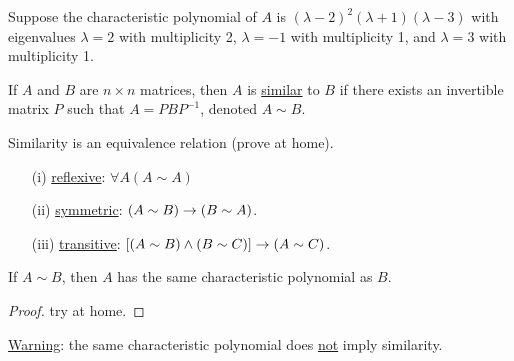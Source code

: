 \documentclass[10pt,a4paper]{article}
\begin{document}
\begin{example}
	Suppose the characteristic polynomial of $A$ is $(\lambda-2)^2(\lambda+1)(\lambda-3)$ with eigenvalues $\lambda=2$ with multiplicity 2, $\lambda=-1$ with multiplicity 1, and $\lambda=3$ with multiplicity 1.
\end{example}
\begin{definition}
	If $A$ and $B$ are $n\times n$ matrices, then $A$ is \underline{similar} to $B$ if there exists an invertible matrix $P$ such that $A = PBP^{-1}$, denoted $A\sim B$.
\end{definition}
\begin{note}
	Similarity is an equivalence relation (prove at home).
	\begin{enumerate}
		\item[(i)] \underline{reflexive}: $\forall A(A\sim A)$
		\item[(ii)] \underline{symmetric}: $(A\sim B)\rightarrow(B\sim A)$.
		\item[(iii)] \underline{transitive}: $[(A\sim B)\land(B\sim C)]\rightarrow(A\sim C)$.
	\end{enumerate}
\end{note}
\begin{theorem}
	If $A\sim B$, then $A$ has the same characteristic polynomial as $B$.
\end{theorem}
\begin{proof}
	try at home.
\end{proof}
\underline{Warning}: the same characteristic polynomial does \underline{not} imply similarity.
\end{document}
